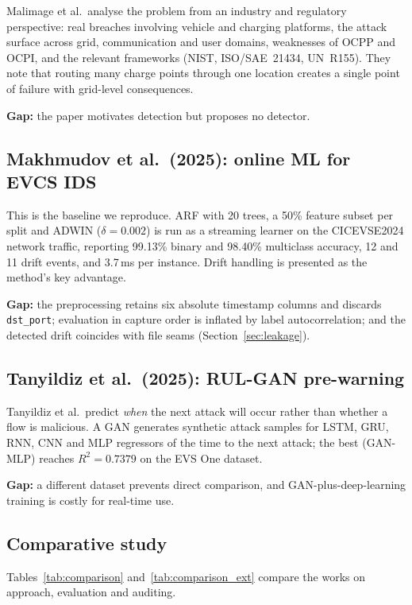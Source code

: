 \documentclass[conference]{IEEEtran}
\newcommand{\col}[1]{\texttt{\small #1}}
\begin{document}
Malimage et al.\ analyse the problem from an industry and regulatory perspective: real breaches involving vehicle and charging platforms, the attack surface across grid, communication and user domains, weaknesses of OCPP and OCPI, and the relevant frameworks (NIST, ISO/SAE~21434, UN~R155). They note that routing many charge points through one location creates a single point of failure with grid-level consequences.

\textbf{Gap:} the paper motivates detection but proposes no detector.

\subsection{Makhmudov et al.\ (2025): online ML for EVCS IDS \cite{b4}}

This is the baseline we reproduce. ARF with 20 trees, a 50\% feature subset per split and ADWIN ($\delta = 0.002$) is run as a streaming learner on the CICEVSE2024 network traffic, reporting 99.13\% binary and 98.40\% multiclass accuracy, 12 and 11 drift events, and 3.7\,ms per instance. Drift handling is presented as the method's key advantage.

\textbf{Gap:} the preprocessing retains six absolute timestamp columns and discards \col{dst\_port}; evaluation in capture order is inflated by label autocorrelation; and the detected drift coincides with file seams (Section~\ref{sec:leakage}).

\subsection{Tanyildiz et al.\ (2025): RUL-GAN pre-warning \cite{b5}}

Tanyildiz et al.\ predict \emph{when} the next attack will occur rather than whether a flow is malicious. A GAN generates synthetic attack samples for LSTM, GRU, RNN, CNN and MLP regressors of the time to the next attack; the best (GAN-MLP) reaches $R^2 = 0.7379$ on the EVS One dataset.

\textbf{Gap:} a different dataset prevents direct comparison, and GAN-plus-deep-learning training is costly for real-time use.

\subsection{Comparative study}

Tables~\ref{tab:comparison} and~\ref{tab:comparison_ext} compare the works on approach, evaluation and auditing.
\end{document}
